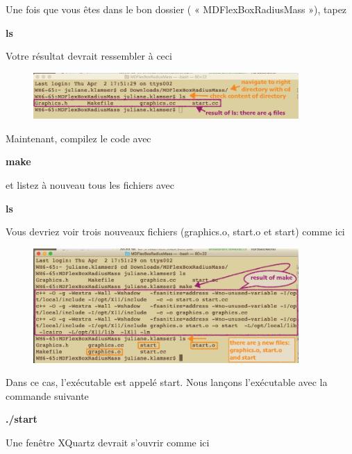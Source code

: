 \documentclass{article}
\begin{document}
Une fois que vous êtes dans le bon dossier ( « MDFlexBoxRadiusMass »), tapez
\begin{tcolorbox}[width=\textwidth,colframe=Bittersweet,colback={black},title={Ceci est le terminal},outer arc=0mm,colupper=white]  
    \large\textbf{  ls }
\end{tcolorbox}
Votre résultat devrait ressembler à ceci
\begin{figure}[H]
\center
\includegraphics[width=0.9\textwidth]{Plots/MD_2CD.png}
\end{figure}
Maintenant, compilez le code avec
\begin{tcolorbox}[width=\textwidth,colframe=Bittersweet,colback={black},title={Ceci est le terminal},outer arc=0mm,colupper=white]  
    \large\textbf{  make }
\end{tcolorbox}
et listez à nouveau tous les fichiers avec
\begin{tcolorbox}[width=\textwidth,colframe=Bittersweet,colback={black},title={Ceci est le terminal},outer arc=0mm,colupper=white]  
    \large\textbf{  ls }
\end{tcolorbox}
Vous devriez voir trois nouveaux fichiers (graphics.o, start.o et start) comme ici
\begin{figure}[H]
\center
\includegraphics[width=0.9\textwidth]{Plots/MD_3Make.png}
\end{figure}
Dans ce cas, l'exécutable est appelé start. Nous lançons l'exécutable avec la commande suivante
\begin{tcolorbox}[width=\textwidth,colframe=Bittersweet,colback={black},title={Ceci est le terminal},outer arc=0mm,colupper=white]  
    \large\textbf{  ./start }
\end{tcolorbox}
Une fenêtre XQuartz devrait s'ouvrir comme ici
\end{document}
